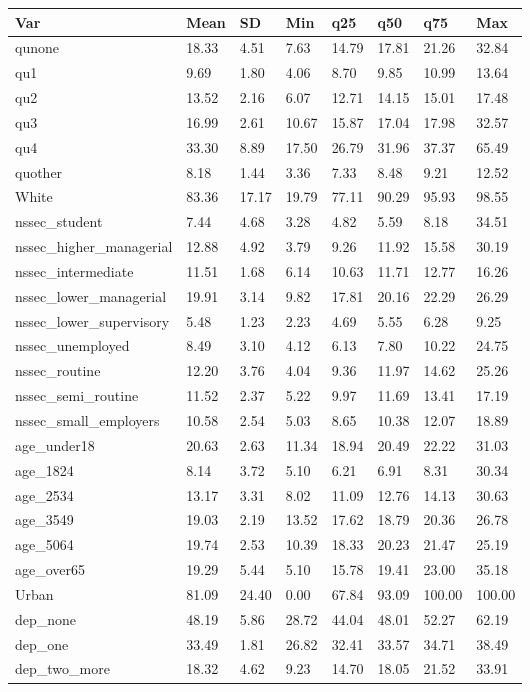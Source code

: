 \begin{tabular}{llllllll}
\toprule
Var & Mean & SD & Min & q25 & q50 & q75 & Max \\
\midrule
qunone & 18.33 & 4.51 & 7.63 & 14.79 & 17.81 & 21.26 & 32.84 \\
qu1 & 9.69 & 1.80 & 4.06 & 8.70 & 9.85 & 10.99 & 13.64 \\
qu2 & 13.52 & 2.16 & 6.07 & 12.71 & 14.15 & 15.01 & 17.48 \\
qu3 & 16.99 & 2.61 & 10.67 & 15.87 & 17.04 & 17.98 & 32.57 \\
qu4 & 33.30 & 8.89 & 17.50 & 26.79 & 31.96 & 37.37 & 65.49 \\
quother & 8.18 & 1.44 & 3.36 & 7.33 & 8.48 & 9.21 & 12.52 \\
White & 83.36 & 17.17 & 19.79 & 77.11 & 90.29 & 95.93 & 98.55 \\
nssec_student & 7.44 & 4.68 & 3.28 & 4.82 & 5.59 & 8.18 & 34.51 \\
nssec_higher_managerial & 12.88 & 4.92 & 3.79 & 9.26 & 11.92 & 15.58 & 30.19 \\
nssec_intermediate & 11.51 & 1.68 & 6.14 & 10.63 & 11.71 & 12.77 & 16.26 \\
nssec_lower_managerial & 19.91 & 3.14 & 9.82 & 17.81 & 20.16 & 22.29 & 26.29 \\
nssec_lower_supervisory & 5.48 & 1.23 & 2.23 & 4.69 & 5.55 & 6.28 & 9.25 \\
nssec_unemployed & 8.49 & 3.10 & 4.12 & 6.13 & 7.80 & 10.22 & 24.75 \\
nssec_routine & 12.20 & 3.76 & 4.04 & 9.36 & 11.97 & 14.62 & 25.26 \\
nssec_semi_routine & 11.52 & 2.37 & 5.22 & 9.97 & 11.69 & 13.41 & 17.19 \\
nssec_small_employers & 10.58 & 2.54 & 5.03 & 8.65 & 10.38 & 12.07 & 18.89 \\
age_under18 & 20.63 & 2.63 & 11.34 & 18.94 & 20.49 & 22.22 & 31.03 \\
age_1824 & 8.14 & 3.72 & 5.10 & 6.21 & 6.91 & 8.31 & 30.34 \\
age_2534 & 13.17 & 3.31 & 8.02 & 11.09 & 12.76 & 14.13 & 30.63 \\
age_3549 & 19.03 & 2.19 & 13.52 & 17.62 & 18.79 & 20.36 & 26.78 \\
age_5064 & 19.74 & 2.53 & 10.39 & 18.33 & 20.23 & 21.47 & 25.19 \\
age_over65 & 19.29 & 5.44 & 5.10 & 15.78 & 19.41 & 23.00 & 35.18 \\
Urban & 81.09 & 24.40 & 0.00 & 67.84 & 93.09 & 100.00 & 100.00 \\
dep_none & 48.19 & 5.86 & 28.72 & 44.04 & 48.01 & 52.27 & 62.19 \\
dep_one & 33.49 & 1.81 & 26.82 & 32.41 & 33.57 & 34.71 & 38.49 \\
dep_two_more & 18.32 & 4.62 & 9.23 & 14.70 & 18.05 & 21.52 & 33.91 \\
\bottomrule
\end{tabular}

